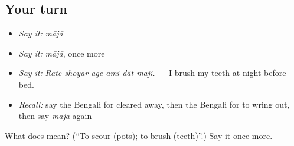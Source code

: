 \subsection*{Your turn}
\begin{itemize}
\raggedright
  \item \emph{Say it:} \emph{mājā}
  \item \emph{Say it:} \emph{mājā}, once more
  \item \emph{Say it:} \emph{Rāte shoyār āge āmi dā̃t māji.} — I brush my teeth at night before bed.
  \item \emph{Recall:} say the Bengali for cleared away, then the Bengali for to wring out, then say \emph{mājā} again
\end{itemize}

\begin{tcolorbox}[breakable,colback=teal!4,colframe=teal!35!black,title={Before you move on}]
What does  mean? (\textquotedblleft{}To scour (pots); to brush (teeth)\textquotedblright{}.) Say it once more.
\end{tcolorbox}
